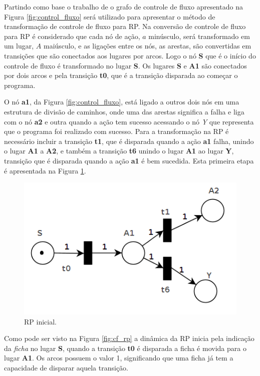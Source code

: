 Partindo como base o trabalho de \cite{winikoff2017bdi} o grafo de controle de fluxo apresentado na Figura \ref{fig:control_fluxo} será utilizado para apresentar o método de transformação de controle de fluxo para RP. Na conversão de controle de fluxo para RP é considerado que cada nó de ação, $a$ minúsculo, será transformado em um lugar, $A$ maiúsculo, e as ligações entre os nós, as arestas, são convertidas em transições que são conectados aos lugares por arcos. Logo o nó \textbf{S} que é o início do controle de fluxo é transformado no lugar \textbf{S}. Os lugares \textbf{S} e \textbf{A1} são conectados por dois arcos e pela transição \textbf{t0}, que é a transição disparada ao começar o programa.

O nó \textbf{a1}, da Figura \ref{fig:control_fluxo}, está ligado a outros dois nós em uma estrutura de divisão de caminhos, onde uma das arestas significa a falha e liga com o nó \textbf{a2} e outra quando a ação tem sucesso acessando o nó \textit{Y} que representa que o programa foi realizado com sucesso. Para a transformação na RP é necessário incluir a transição \textbf{t1}, que é disparada quando a ação \textbf{a1} falha, unindo o lugar \textbf{A1} a \textbf{A2}, e também a transição \textbf{t6} unindo o lugar \textbf{A1} ao lugar \textbf{Y}, transição que é disparada quando a ação \textbf{a1}  é bem sucedida. Esta primeira etapa é apresentada na Figura \ref{fig:4-fluxo-rp0.png}.

\begin{figure}[ht]
    \centering
    \includegraphics[scale=0.4]{imagens/4-fluxo-rp0.png}
    \caption{RP inicial.}
    \label{fig:4-fluxo-rp0.png}
\end{figure}

Como pode ser visto na Figura \ref{fig:cf_rp} a dinâmica da RP inicia pela indicação da \textit{ficha} no lugar \textbf{S}, quando a transição \textbf{t0} é disparada a ficha é movida para o lugar \textbf{A1}. Os arcos possuem o valor 1, significando que uma ficha já tem a capacidade de disparar aquela transição.

